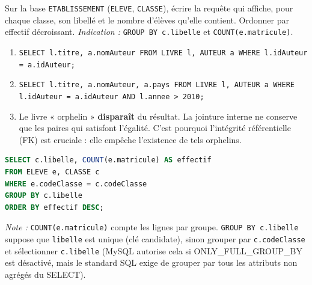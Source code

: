 \documentclass[11pt]{article}
\begin{document}
\begin{exercice}
Sur la base \texttt{ETABLISSEMENT} (\texttt{ELEVE}, \texttt{CLASSE}), écrire la requête qui affiche, pour chaque classe, son libellé et le nombre d'élèves qu'elle contient. Ordonner par effectif décroissant.
\textit{Indication :} \texttt{GROUP BY c.libelle} et \texttt{COUNT(e.matricule)}.
\end{exercice}

\begin{corrige}[Exercice 1]
\begin{enumerate}
\item \texttt{SELECT l.titre, a.nomAuteur FROM LIVRE l, AUTEUR a WHERE l.idAuteur = a.idAuteur;}
\item \texttt{SELECT l.titre, a.nomAuteur, a.pays FROM LIVRE l, AUTEUR a WHERE l.idAuteur = a.idAuteur AND l.annee > 2010;}
\item Le livre « orphelin » \textbf{disparaît} du résultat. La jointure interne ne conserve que les paires qui satisfont l'égalité. C'est pourquoi l'intégrité référentielle (FK) est cruciale : elle empêche l'existence de tels orphelins.
\end{enumerate}
\end{corrige}

\begin{corrige}[Exercice 2]
\begin{lstlisting}[language=SQL]
SELECT c.libelle, COUNT(e.matricule) AS effectif
FROM ELEVE e, CLASSE c
WHERE e.codeClasse = c.codeClasse
GROUP BY c.libelle
ORDER BY effectif DESC;
\end{lstlisting}
\textit{Note :} \texttt{COUNT(e.matricule)} compte les lignes par groupe. \texttt{GROUP BY c.libelle} suppose que \texttt{libelle} est unique (clé candidate), sinon grouper par \texttt{c.codeClasse} et sélectionner \texttt{c.libelle} (MySQL autorise cela si ONLY\_FULL\_GROUP\_BY est désactivé, mais le standard SQL exige de grouper par tous les attributs non agrégés du SELECT).
\end{corrige}
\end{document}
